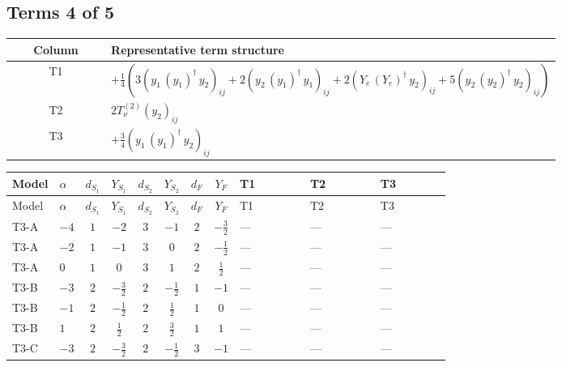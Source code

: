 \documentclass[8pt]{article}
\begin{document}
\begin{landscape}
\subsection*{Terms 4 of 5}
\begin{center}
\begin{tabular}{@{}c >{\raggedright\arraybackslash}p{0.82\linewidth}@{}}
\toprule
Column & Representative term structure \\
\midrule
T1 & \(\displaystyle +\frac{1}{4} (3 \left({y_1}\,\left({y_1}\right)^{\dagger}\,{y_2}\right)_{ij}+2 \left({y_2}\,\left({y_1}\right)^{\dagger}\,{y_1}\right)_{ij}+2 \left({Y_e}\,\left({Y_e}\right)^{\dagger}\,{y_2}\right)_{ij}+5 \left({y_2}\,\left({y_2}\right)^{\dagger}\,{y_2}\right)_{ij})\) \\
\midrule
T2 & \(\displaystyle 2 T_{\nu}^{(2)} \left({y_2}\right)_{ij}\) \\
\midrule
T3 & \(\displaystyle +\frac{3}{4} \left({y_1}\,\left({y_1}\right)^{\dagger}\,{y_2}\right)_{ij}\) \\
\midrule
\bottomrule
\end{tabular}
\end{center}
\smallskip
\tiny
\begin{longtable}{@{}llcccccc >{\raggedright\arraybackslash}p{0.21\linewidth} >{\raggedright\arraybackslash}p{0.21\linewidth} >{\raggedright\arraybackslash}p{0.21\linewidth}@{}}
\toprule
Model & $\alpha$ & $d_{S_1}$ & $Y_{S_1}$ & $d_{S_2}$ & $Y_{S_2}$ & $d_F$ & $Y_F$ & T1 & T2 & T3 \\
\midrule
\endfirsthead
\toprule
Model & $\alpha$ & $d_{S_1}$ & $Y_{S_1}$ & $d_{S_2}$ & $Y_{S_2}$ & $d_F$ & $Y_F$ & T1 & T2 & T3 \\
\midrule
\endhead
T3-A & $-4$ & $1$ & $-2$ & $3$ & $-1$ & $2$ & $-\frac{3}{2}$ & --- & --- & --- \\
\midrule
T3-A & $-2$ & $1$ & $-1$ & $3$ & $0$ & $2$ & $-\frac{1}{2}$ & --- & --- & --- \\
\midrule
T3-A & $0$ & $1$ & $0$ & $3$ & $1$ & $2$ & $\frac{1}{2}$ & --- & --- & --- \\
\midrule
T3-B & $-3$ & $2$ & $-\frac{3}{2}$ & $2$ & $-\frac{1}{2}$ & $1$ & $-1$ & --- & --- & --- \\
\midrule
T3-B & $-1$ & $2$ & $-\frac{1}{2}$ & $2$ & $\frac{1}{2}$ & $1$ & $0$ & --- & --- & --- \\
\midrule
T3-B & $1$ & $2$ & $\frac{1}{2}$ & $2$ & $\frac{3}{2}$ & $1$ & $1$ & --- & --- & --- \\
\midrule
T3-C & $-3$ & $2$ & $-\frac{3}{2}$ & $2$ & $-\frac{1}{2}$ & $3$ & $-1$ & --- & --- & --- \\

\end{longtable}
\end{landscape}
\end{document}
